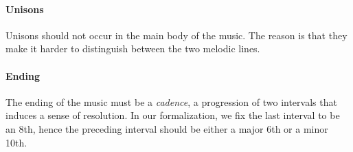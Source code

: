 \paragraph{Unisons}
Unisons should not occur in the main body of the music.
The reason is that they make it harder to distinguish between
the two melodic lines.

\paragraph{Ending}
The ending of the music must be a \emph{cadence}, a progression
of two intervals that induces a sense of resolution.
In our formalization, we fix the last interval to be an 8th,
hence the preceding interval should be either a major 6th or a minor 10th.
